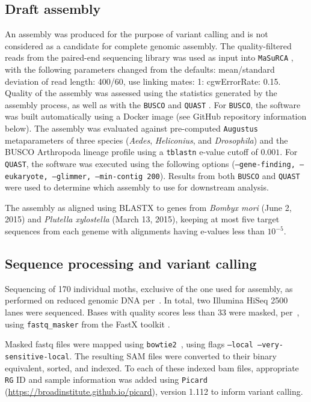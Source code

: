 \documentclass[smallextended]{svjour3}
\begin{document}
\subsection*{Draft assembly}

An assembly was produced for the purpose of variant calling and is not
considered as a candidate for complete genomic assembly. The quality-filtered
reads from the paired-end sequencing library was used as input into
\texttt{MaSuRCA} \citep[][versions 2.3.2, 3.1.3]{Zimin:2013kn}, with the
following parameters changed from the defaults: mean/standard deviation of read
length: 400/60, use linking mates: 1: cgwErrorRate: 0.15.  Quality of the
assembly was assessed using the statistics generated by the assembly process, as
well as with the \texttt{BUSCO} \citep[][version 1.1b1]{Simao:2015kk} and
\texttt{QUAST} \citep[][version 3.2]{Gurevich:2013je}. For \texttt{BUSCO}, the
software was built automatically using a Docker image (see GitHub repository
information below). The assembly was evaluated against pre-computed
\texttt{Augustus} \citep{Stanke:2003eo} metaparameters of three species
(\textit{Aedes}, \textit{Heliconius}, and \textit{Drosophila}) and the BUSCO
Arthropoda lineage profile using a \texttt{tblastn} e-value cutoff of $0.001$.
For \texttt{QUAST}, the software was executed using the following options
(\texttt{--gene-finding, --eukaryote, --glimmer, --min-contig 200}).  Results
from both \texttt{BUSCO} and \texttt{QUAST} were used to determine which
assembly to use for downstream analysis.

The assembly as aligned using BLASTX \citep[][version 2.2.30+]{Camacho:2009fc}
to genes from \textit{Bombyx mori} (June 2, 2015) and  \textit{Plutella
xylostella} (March 13, 2015), keeping at most five target sequences from each
geneme with alignments having e-values less than $10^{-5}$.


\subsection*{Sequence processing and variant calling} Sequencing of 170
individual moths, exclusive of the one used for assembly,  as performed on
reduced genomic DNA per~\cite{PARCHMAN:2012ca}. In total, two Illumina HiSeq
2500 lanes were sequenced. Bases with quality scores less than 33 were masked,
per~\cite{Yun:2014dn},  using \texttt{fastq\_masker} from the FastX toolkit
\citep[][version 0.0.14]{citeulike:9103573}.

Masked fastq files were mapped using \texttt{bowtie2}~\citep[][version
2.2.4]{Langmead:2012jh}, using flags  \texttt{--local --very-sensitive-local}.
The resulting  SAM files were converted to their binary equivalent, sorted,
and indexed. To each of these indexed bam files, appropriate \texttt{RG} ID and
sample information was added using \texttt{Picard}
(\url{https://broadinstitute.github.io/picard}), version 1.112 to inform variant
calling.
\end{document}
